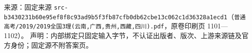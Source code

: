 
\begin{gktip}
来源：固定来源 \texttt{src-b3430231b60e95ef8f8c93ad9b5f3fb87cfb0db62cbe13c062c1d36328a1ecd1}（\texttt{普通高考/2019/2019全国3理(云南,广西,贵州,西藏,四川).pdf}，原卷印刷页 1101—1102）。
声明：内部绑定只固定输入字节，不认证出版者、版次、上游来源链及官方身份；固定源不附答案页。
\end{gktip}

\par\medskip


